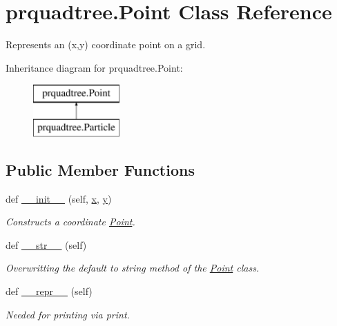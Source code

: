 \section{prquadtree.\+Point Class Reference}
\label{classprquadtree_1_1Point}


Represents an (x,y) coordinate point on a grid.  


Inheritance diagram for prquadtree.\+Point\+:\begin{figure}[H]
\begin{center}
\leavevmode
\includegraphics[height=2.000000cm]{classprquadtree_1_1Point}
\end{center}
\end{figure}
\subsection*{Public Member Functions}
\begin{DoxyCompactItemize}
\item 
def \hyperlink{classprquadtree_1_1Point_a1179022b24fec8ea7a8e0a7e9e7f664d}{\+\_\+\+\_\+init\+\_\+\+\_\+} (self, \hyperlink{classprquadtree_1_1Point_a769eeb814487b26593281a720cc43813}{x}, \hyperlink{classprquadtree_1_1Point_acc50fd274155e9a89996263a7e9f20db}{y})
\begin{DoxyCompactList}\small\item\em Constructs a coordinate \hyperlink{classprquadtree_1_1Point}{Point}. \end{DoxyCompactList}\item 
def \hyperlink{classprquadtree_1_1Point_ad33b3a05f6dce4daea0b307a42aa2453}{\+\_\+\+\_\+str\+\_\+\+\_\+} (self)
\begin{DoxyCompactList}\small\item\em Overwritting the default to string method of the \hyperlink{classprquadtree_1_1Point}{Point} class. \end{DoxyCompactList}\item 
def \hyperlink{classprquadtree_1_1Point_a8a9a5215cda0279f6958a0b55b4bc11d}{\+\_\+\+\_\+repr\+\_\+\+\_\+} (self)
\begin{DoxyCompactList}\small\item\em Needed for printing via \textquotesingle{}print\textquotesingle{}. \end{DoxyCompactList}\end{DoxyCompactItemize}
